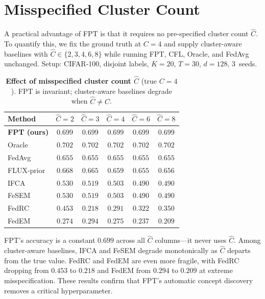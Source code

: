 \documentclass[11pt]{article}
\begin{document}
\section{Misspecified Cluster Count}
\label{app:misspecified_c}

A practical advantage of FPT is that it requires no pre-specified cluster count $\hat C$.
To quantify this, we fix the ground truth at $C{=}4$ and supply cluster-aware baselines with $\hat C \in \{2, 3, 4, 6, 8\}$ while running FPT, CFL, Oracle, and FedAvg unchanged.
Setup: CIFAR-100, disjoint labels, $K{=}20$, $T{=}30$, $d{=}128$, 3~seeds.

\begin{table}[h]
\centering
\caption{\textbf{Effect of misspecified cluster count $\hat C$} (true $C{=}4$).
FPT is invariant; cluster-aware baselines degrade when $\hat C \ne C$.}
\label{tab:misspec}
\small
\begin{tabular}{lccccc}
\toprule
Method & $\hat C{=}2$ & $\hat C{=}3$ & $\hat C{=}4$ & $\hat C{=}6$ & $\hat C{=}8$ \\
\midrule
\textbf{FPT (ours)} & $\mathbf{0.699}$ & $\mathbf{0.699}$ & $\mathbf{0.699}$ & $\mathbf{0.699}$ & $\mathbf{0.699}$ \\
Oracle               & $0.702$ & $0.702$ & $0.702$ & $0.702$ & $0.702$ \\
FedAvg               & $0.655$ & $0.655$ & $0.655$ & $0.655$ & $0.655$ \\
\midrule
FLUX-prior           & $0.668$ & $0.665$ & $0.659$ & $0.655$ & $0.656$ \\
IFCA                 & $0.530$ & $0.519$ & $0.503$ & $0.490$ & $0.490$ \\
FeSEM                & $0.530$ & $0.519$ & $0.503$ & $0.490$ & $0.490$ \\
FedRC                & $0.453$ & $0.218$ & $0.291$ & $0.322$ & $0.350$ \\
FedEM                & $0.274$ & $0.294$ & $0.275$ & $0.237$ & $0.209$ \\
\bottomrule
\end{tabular}
\end{table}

FPT's accuracy is a constant $0.699$ across all $\hat C$ columns---it never uses $\hat C$.
Among cluster-aware baselines, IFCA and FeSEM degrade monotonically as $\hat C$ departs from the true value.
FedRC and FedEM are even more fragile, with FedRC dropping from $0.453$ to $0.218$ and FedEM from $0.294$ to $0.209$ at extreme misspecification.
These results confirm that FPT's automatic concept discovery removes a critical hyperparameter.
\end{document}
